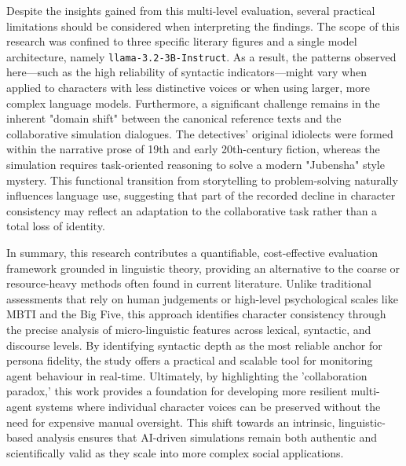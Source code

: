 \documentclass{article}
\begin{document}
Despite the insights gained from this multi-level evaluation, several practical limitations should be considered when interpreting the findings. The scope of this research was confined to three specific literary figures and a single model architecture, namely \texttt{llama-3.2-3B-Instruct}. As a result, the patterns observed here—such as the high reliability of syntactic indicators—might vary when applied to characters with less distinctive voices or when using larger, more complex language models. Furthermore, a significant challenge remains in the inherent "domain shift" between the canonical reference texts and the collaborative simulation dialogues. The detectives' original idiolects were formed within the narrative prose of 19th and early 20th-century fiction, whereas the simulation requires task-oriented reasoning to solve a modern "Jubensha" style mystery. This functional transition from storytelling to problem-solving naturally influences language use, suggesting that part of the recorded decline in character consistency may reflect an adaptation to the collaborative task rather than a total loss of identity.

In summary, this research contributes a quantifiable, cost-effective evaluation framework grounded in linguistic theory, providing an alternative to the coarse or resource-heavy methods often found in current literature. Unlike traditional assessments that rely on human judgements or high-level psychological scales like MBTI and the Big Five, this approach identifies character consistency through the precise analysis of micro-linguistic features across lexical, syntactic, and discourse levels. By identifying syntactic depth as the most reliable anchor for persona fidelity, the study offers a practical and scalable tool for monitoring agent behaviour in real-time. Ultimately, by highlighting the 'collaboration paradox,' this work provides a foundation for developing more resilient multi-agent systems where individual character voices can be preserved without the need for expensive manual oversight. This shift towards an intrinsic, linguistic-based analysis ensures that AI-driven simulations remain both authentic and scientifically valid as they scale into more complex social applications.

\end{document}
